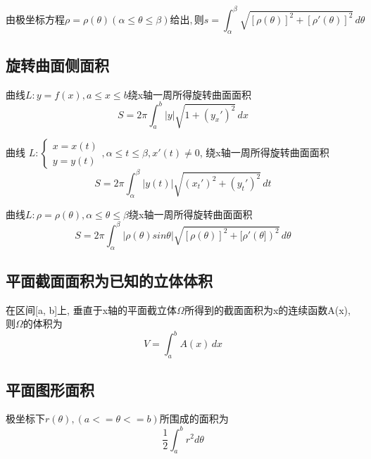 \begin{displaymath}
由极坐标方程\rho = \rho(\theta)(\alpha \leq \theta \leq \beta)给出,
则s = \int_{\alpha}^{\beta} \sqrt{[\rho(\theta)]^2 + [\rho'(\theta)]^2} \,d\theta
\end{displaymath}


\subsection{旋转曲面侧面积}

曲线\(L : y = f(x), a \leq x \leq b\)绕x轴一周所得旋转曲面面积
\begin{displaymath}
S = 2\pi \int_{a}^{b}|y|\sqrt{1 + (y_x')^2} \,dx
\end{displaymath}

曲线
\(
L : 
\begin{cases}
x = x(t) \\
y = y(t)
\end{cases},
\alpha \leq t \leq \beta, x'(t) \neq 0
\),
绕x轴一周所得旋转曲面面积
\begin{displaymath}
S = 2\pi \int_{\alpha}^{\beta}|y(t)|\sqrt{(x_t')^2 + (y_t')^2} \,dt
\end{displaymath}

曲线\(L : \rho = \rho(\theta), \alpha \leq \theta \leq \beta\)绕x轴一周所得旋转曲面面积
\begin{displaymath}
S = 2\pi \int_{\alpha}^{\beta}|\rho(\theta)sin\theta|
\sqrt{[\rho(\theta)]^2 + [\rho'(\theta])^2} \,d\theta
\end{displaymath}


\subsection{平面截面面积为已知的立体体积}

在区间[a, b]上, 垂直于x轴的平面截立体\(\Omega\)所得到的截面面积为x的连续函数A(x), 则\(\Omega\)的体积为
\begin{displaymath}
V = \int_{a}^{b} A(x) \,dx
\end{displaymath}


\subsection{平面图形面积}

极坐标下\(r(\theta), (a <= \theta <= b)\)所围成的面积为\[\dfrac{1}{2}\int_a^br^2d\theta\]







